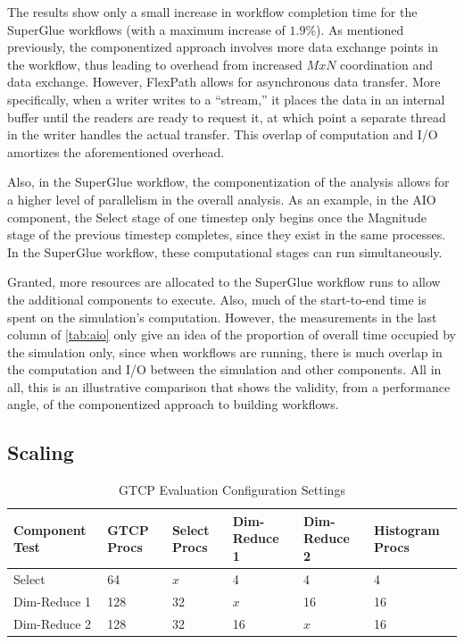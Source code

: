 The results show only a small increase in
workflow completion time for the SuperGlue
workflows (with a maximum increase of $1.9 \%$).
As mentioned previously, the componentized
approach involves more data exchange points
in the workflow, thus leading to
overhead from increased $MxN$ coordination and data exchange.
However, FlexPath allows
for asynchronous data transfer.
More specifically, when a writer writes to
a ``stream,'' it places
the data in an internal buffer
until the readers are ready to request it,
at which point a separate thread in the writer
handles the actual transfer.
This overlap
of computation and I/O
amortizes the aforementioned overhead.

Also, in the SuperGlue workflow,
the componentization of the analysis
allows for a higher level of parallelism in the overall
analysis. As an example, in the AIO component,
the Select stage of one timestep
only begins once the Magnitude
stage of the previous timestep
completes, since they exist in the same processes.
In the SuperGlue workflow, these
computational stages can run simultaneously.

Granted, more resources are allocated to the
SuperGlue workflow runs to allow the additional
components to execute.
Also, much of the start-to-end time is spent on
the simulation's computation.
However, the measurements in the last column
of \autoref{tab:aio}
only give an idea of the proportion of 
overall time occupied by the simulation only,
since when workflows are running, there is much
overlap in the computation and I/O between the
simulation and other components.
All in all, this is
an illustrative comparison that shows the validity,
from a performance angle,
of the componentized approach
to building workflows.

\subsection{Scaling}

\begin{table}[tbp]
  \centering
  \caption{GTCP Evaluation Configuration Settings}
  \label{tab:eval-strong-gtcp}
  \vspace{-0.05in}
  \begin{tabular}{|l|l|l|l|l|l|}
    \hline
    Component Test & GTCP Procs & Select Procs & Dim-Reduce 1 & Dim-Reduce 2 & Histogram Procs \\
    \hline
    Select & 64 & $x$ & 4 & 4 & 4\\
    \hline
    Dim-Reduce 1 & 128 & 32 & $x$ & 16 & 16\\
    \hline
    Dim-Reduce 2 & 128 & 32 & 16 & $x$ & 16\\
    \hline
  \end{tabular}
  \vspace{-0.07in}
\end{table}

